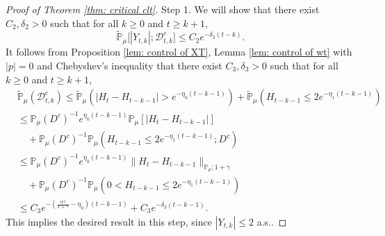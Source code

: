 \documentclass[12pt,a4paper]{amsart}
\theoremstyle{plain}
\theoremstyle{definition}
\numberwithin{equation}{section}
\begin{document}
\begin{proof}[Proof of Theorem \ref{thm: critical clt}]
  Step 1. We will show that there exist $C_2,\delta_2 >0$ such that for all $k \geq 0$ and $t\geq k+1$,
  \begin{equation}
    \label{thm121}
    \mathbb{\widetilde{P}}_{\mu}\big[|Y_{t,k}|;\mathcal{D}^c_{t,k}\big]
    \leq C_2 e^{-\delta_2 (t-k)}.
  \end{equation}
  It follows from Proposition \ref{lem: control of XT}, Lemma \ref{lem: control of wt} with $|p|=0$ and Chebyshev's inequality that there exist $C_3, \delta_3>0$ such that for all $k \geq 0$ and $t\geq k+1$,
  \begin{align}
    \label{eq: prob of Dtkc}
    & \mathbb{\widetilde{P}}_{\mu}(\mathcal{D}_{t,k}^c)
    \leq \mathbb{\widetilde{P}}_{\mu}(|H_t-H_{t-k-1}| > e^{-\eta_0 (t-k-1)})+\mathbb{\widetilde{P}}_{\mu}(H_{t-k-1}\leq 2e^{-\eta_1(t-k-1)}) \\
    & \leq \mathbb{P}_{\mu}(D^c)^{-1}e^{\eta_0(t-k-1)}\mathbb{P}_{\mu}[|H_t-H_{t-k-1}|] \\
    & \quad 
      + \mathbb{P}_{\mu}(D^c)^{-1} \mathbb P_\mu(H_{t-k-1}\leq 2e^{-\eta_1(t-k-1)}; D^c) \\
    & \leq \mathbb{P}_{\mu}(D^c)^{-1}  e^{\eta_0(t-k-1)}\|H_t - H_{t-k-1}\|_{\mathbb P_\mu; 1+\gamma} \\
    & \quad + \mathbb{P}_{\mu}(D^c)^{-1} \mathbb P_\mu(0<H_{t-k-1}\leq 2e^{-\eta_1(t-k-1)}) \\
    & \leq C_3 e^{-(\frac{\alpha \gamma}{1+\gamma} - \eta_0)(t-k-1)}+C_3 e^{-\delta_3(t-k-1)}.
  \end{align}
  This implies the desired result in this step, since $|Y_{t,k}| \leq 2$ a.s..
  

\end{proof}
\end{document}
